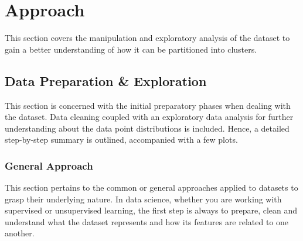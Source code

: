 \documentclass[11pt]{article}
\begin{document}
\vspace{1\baselineskip}
\section{Approach}

This section covers the manipulation and exploratory analysis of the dataset to gain a better understanding of how it can be partitioned into clusters.

\vspace{1\baselineskip}
\subsection{Data Preparation \& Exploration}

This section is concerned with the initial preparatory phases when dealing with the dataset. Data cleaning coupled with an exploratory data analysis for further understanding about the data point distributions is included. Hence, a detailed step-by-step summary is outlined, accompanied with a few plots.

\vspace{1\baselineskip}
\subsubsection{General Approach}

This section pertains to the common or general approaches applied to datasets to grasp their underlying nature. In data science, whether you are working with supervised or unsupervised learning, the first step is always to prepare, clean and understand what the dataset represents and how its features are related to one another.
\end{document}
